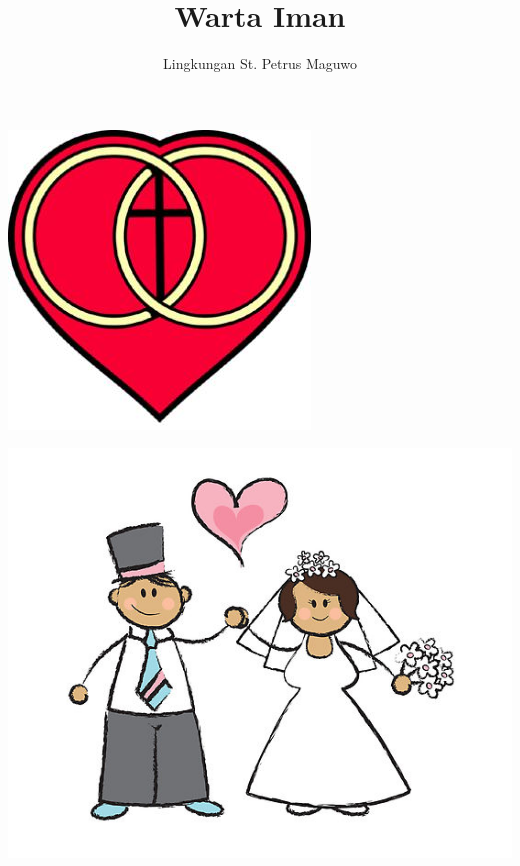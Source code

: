 \documentclass[a5paper,titlepage,10pt,openany]{scrbook}
\author{Lingkungan St. Petrus Maguwo}
\title{Warta Iman}
\begin{document}
\thispagestyle{empty}

\setlength{\parindent}{1cm}
\pagestyle{plain}
%






\begin{center}
\bigskip
\includegraphics[scale=0.5]{gambar/wedding-4.jpg}
\end{center}


\begin{center}
\includegraphics[scale=0.25]{gambar/just-married.jpg}
\end{center}

\end{document}
